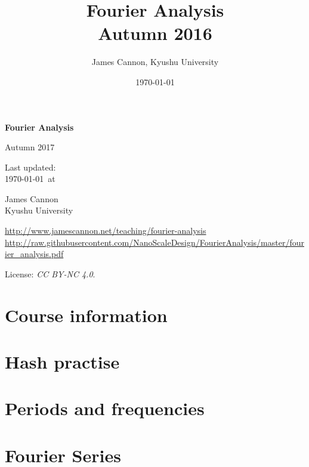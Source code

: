 \documentclass[a4paper]{book} %
\title{Fourier Analysis\\Autumn 2016}
\author{James Cannon, Kyushu University}
\date{\today}
\newcommand{\courseyear}{2017 }
\newcommand{\courseurl}{fourier-analysis}
\begin{document}
\begin{titlepage}
    \begin{center}
        \vspace*{1cm}

        \Huge
        \textbf{Fourier Analysis}

        Autumn \courseyear

        \vspace{1.5cm}
        \Large
        Last updated:\\\today \ at \currenttime

        \vspace{4.0cm}
        \LARGE
        James Cannon\\Kyushu University
        \vfill

        \normalsize
        \url{http://www.jamescannon.net/teaching/\courseurl}\\
        \vspace{0.2cm}
        \small
        \url{http://raw.githubusercontent.com/NanoScaleDesign/FourierAnalysis/master/fourier_analysis.pdf}
        \vspace{0.5cm}

        License: \emph{CC BY-NC 4.0}.

    \end{center}
\end{titlepage}

\setcounter{chapter}{-1}

\tableofcontents

\chapter{Course information}
\newpage



%

\chapter{Hash practise}

\chapter{Periods and frequencies}

\chapter{Fourier Series}

%
%
%
%
\end{document}
